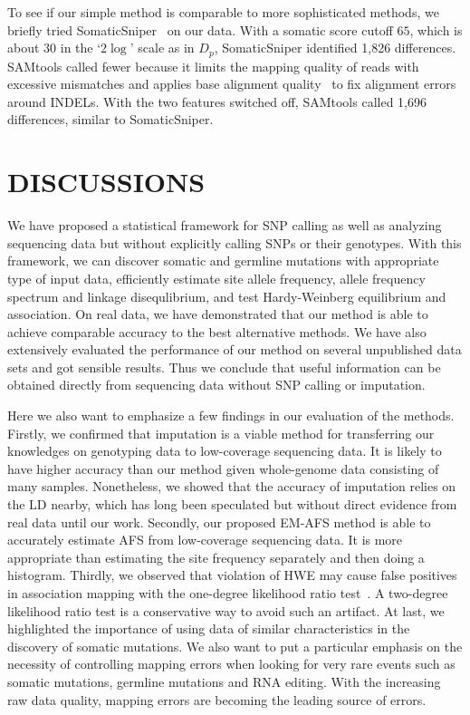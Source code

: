 \documentclass{bioinfo}
\begin{document}
To see if our simple method is comparable to more sophisticated methods, we
briefly tried SomaticSniper~\citep{Larson:2011xx} on our data.  With a somatic
score cutoff $65$, which is about $30$ in the `$2\log$' scale as in $D_p$,
SomaticSniper identified 1,826 differences.  SAMtools called fewer because it
limits the mapping quality of reads with excessive mismatches and applies base
alignment quality~\citep{Li:2011kx} to fix alignment errors around INDELs.
With the two features switched off, SAMtools called 1,696 differences, similar
to SomaticSniper.

\section{DISCUSSIONS}

We have proposed a statistical framework for SNP calling as well as analyzing
sequencing data but without explicitly calling SNPs or their genotypes. With
this framework, we can discover somatic and germline mutations with appropriate
type of input data, efficiently estimate site allele frequency, allele
frequency spectrum and linkage disequlibrium, and test Hardy-Weinberg
equilibrium and association. On real data, we have demonstrated that our method
is able to achieve comparable accuracy to the best alternative methods.  We
have also extensively evaluated the performance of our method on several
unpublished data sets and got sensible results. Thus we conclude that useful
information can be obtained directly from sequencing data without SNP calling
or imputation.

Here we also want to emphasize a few findings in our evaluation of the methods.
Firstly, we confirmed that imputation is a viable method for transferring our
knowledges on genotyping data to low-coverage sequencing data.  It is likely to
have higher accuracy than our method given whole-genome data consisting of many
samples. Nonetheless, we showed that the accuracy of imputation relies on the
LD nearby, which has long been speculated but without direct evidence from real
data until our work. Secondly, our proposed EM-AFS method is able to accurately
estimate AFS from low-coverage sequencing data. It is more appropriate than
estimating the site frequency separately and then doing a histogram.  Thirdly,
we observed that violation of HWE may cause false positives in association
mapping with the one-degree likelihood ratio test~\citep{Kim:2011fk}. A
two-degree likelihood ratio test is a conservative way to avoid such an
artifact. At last, we highlighted the importance of using data of similar
characteristics in the discovery of somatic mutations. We also want to put a
particular emphasis on the necessity of controlling mapping errors when looking
for very rare events such as somatic mutations, germline mutations and RNA
editing. With the increasing raw data quality, mapping errors are becoming the
leading source of errors.
\end{document}
